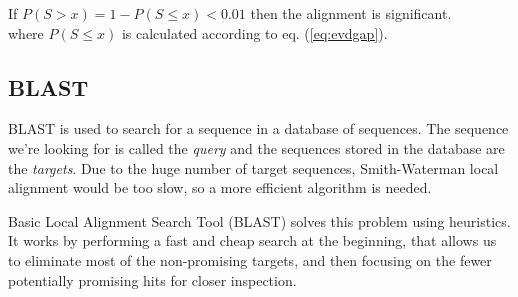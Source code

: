 If $P(S > x) = 1 - P(S \le x) < 0.01$ then the alignment is significant. \\
where $ P(S \le x)$ is calculated according to eq. (\ref{eq:evdgap}).

\subsection{BLAST}

BLAST is used to search for a sequence in a database of sequences. The sequence we're looking for is called the {\em query} and the sequences stored in the database are the {\em targets}. Due to the huge number of target sequences, Smith-Waterman local alignment would be too slow, so a more efficient algorithm is needed.

Basic Local Alignment Search Tool (BLAST) solves this problem using heuristics. It works by performing a fast and cheap search at the beginning,
that allows us to eliminate most of the non-promising targets, and then focusing on the fewer potentially promising hits for closer inspection.

